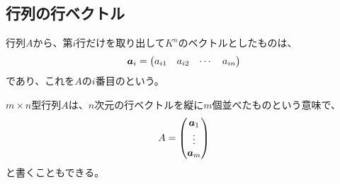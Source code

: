 \documentclass[../../../topic_linear-algebra]{subfiles}
\begin{document}
\subsection{行列の行ベクトル}

行列$A$から、第$i$行だけを取り出して$K^n$のベクトルとしたものは、
\begin{equation*}
  \vb*{a}_i = \begin{pmatrix}
    a_{i1} & a_{i2} & \cdots & a_{in}
  \end{pmatrix}
\end{equation*}
であり、これを$A$の$i$番目のという。

\br

$m \times n$型行列$A$は、$n$次元の行ベクトルを縦に$m$個並べたものという意味で、
\begin{equation*}
  A = \begin{pmatrix}
    \vb*{a}_1 \\
    \vdots \\
    \vb*{a}_m
  \end{pmatrix}
\end{equation*}
と書くこともできる。
\end{document}

